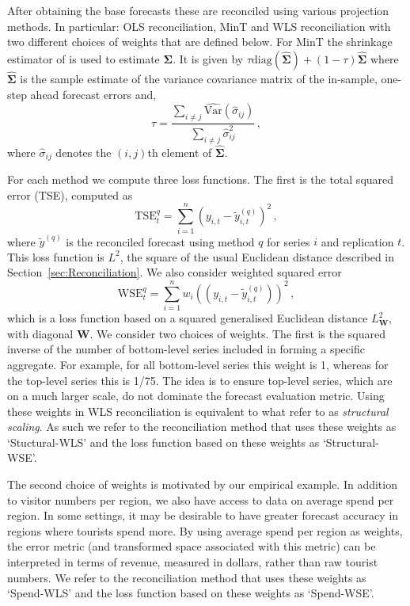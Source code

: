 \documentclass[12pt]{article}
\def\var{\text{Var}}
\theoremstyle{definition}
\begin{document}
After obtaining the base forecasts these are reconciled using various projection methods. In particular: OLS reconciliation, MinT and WLS reconciliation with two different choices of weights that are defined below.  For MinT the shrinkage estimator of \cite{Schafer2005} is used to estimate  $\bm{\Sigma}$. It is given by $\tau\text{diag}(\hat{\bm{\Sigma}}) + (1-\tau)\hat{\bm{\Sigma}}$  where $\hat{\bm{\Sigma}}$ is the sample estimate of the variance covariance matrix of the in-sample, one-step ahead forecast errors and,
	\begin{equation*}
	\tau = \frac{\sum_{i \neq j}\hat{\var}(\hat{\sigma}_{ij})}{\sum_{i \neq j}{\hat{\sigma}}^2_{ij}}\,,
	\end{equation*}
	where $\hat{\sigma}_{ij}$ denotes the $(i,j)$th element of $\hat{\bm{\Sigma}}$.

{\color{blue} For each method we compute three loss functions.  The first is the total squared error (TSE), computed as
	\begin{equation}
	\label{eq:tse}
	\textrm{TSE}^{q}_t=\sum\limits_{i=1}^n(y_{i,t}-\tilde{y}^{(q)}_{i,t})^2\,,
	\end{equation}
	where $\tilde{y}^{(q)}$ is the reconciled forecast using method $q$ for series $i$ and replication $t$.
This loss function is $L^2$, the square of the usual Euclidean distance described in Section~\ref{sec:Reconciliation}. We also consider weighted squared error
\begin{equation*}
	\textrm{WSE}^{q}_t=\sum\limits_{i=1}^n w_i\left( (y_{i,t}-\tilde{y}^{(q)}_{i,t})\right)^2\,,
	\end{equation*}
	which is a loss function based on a squared generalised Euclidean distance $L_{\bm{W}}^2$, with diagonal $\bm{W}$.  We consider two choices of weights.  The first is the squared inverse of the number of bottom-level series included in forming a specific aggregate.  For example, for all bottom-level series this weight is 1, whereas for the top-level series this is 1/75.  The idea is to ensure top-level series, which are on a much larger scale, do not dominate the forecast evaluation metric.  Using these weights in WLS reconciliation is equivalent to what \cite{AthEtAl2017} refer to as \textit{structural scaling}.  As such we refer to the reconciliation method that uses these weights as `Stuctural-WLS' and the loss function based on these weights as `Structural-WSE'.
	
	The second choice of weights is motivated by our empirical example.  In addition to visitor numbers per region, we also have access to data on average spend per region.  In some settings, it may be desirable to have greater forecast accuracy in regions where tourists spend more.  By using average spend per region as weights, the error metric (and transformed space associated with this metric) can be interpreted in terms of revenue, measured in dollars, rather than raw tourist numbers.  We refer to the reconciliation method that uses these weights as `Spend-WLS' and the loss function based on these weights as `Spend-WSE'.
}
\end{document}
